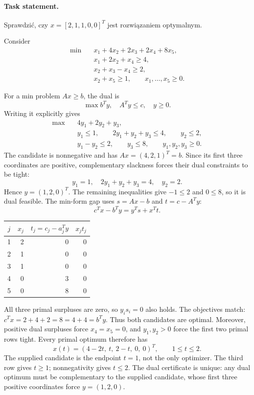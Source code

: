 \documentclass[11pt,a4paper]{article}
\begin{document}
\paragraph{Task statement.}
\foreignlanguage{polish}{Sprawdzić, czy $x=[2,1,1,0,0]^T$ jest rozwiązaniem
optymalnym.}
\begin{lecturecore}
  Consider
  \[
    \begin{aligned}
      \min\quad &x_1+4x_2+2x_3+2x_4+8x_5,\\
      &x_1+2x_2+x_4\geq4,\\
      &x_2+x_3-x_4\geq2,\\
      &x_2+x_5\geq1,\qquad x_1,\ldots,x_5\geq0.
    \end{aligned}
  \]
\end{lecturecore}
For a min problem $Ax\geq b$, the dual is
\[
  \max b^Ty,\quad A^Ty\leq c,\quad y\geq0.
\]
Writing it explicitly gives
\[
  \begin{aligned}
    \max\quad &4y_1+2y_2+y_3,\\
    &y_1\leq1,\qquad 2y_1+y_2+y_3\leq4,\qquad y_2\leq2,\\
    &y_1-y_2\leq2,\qquad y_3\leq8,\qquad y_1,y_2,y_3\geq0.
  \end{aligned}
\]
The candidate is nonnegative and has $Ax=(4,2,1)^T=b$. Since its first three
coordinates are positive, complementary slackness forces their dual constraints
to be tight:
\[
  y_1=1,\quad 2y_1+y_2+y_3=4,\quad y_2=2.
\]
Hence $y=(1,2,0)^T$. The remaining inequalities give $-1\leq2$ and $0\leq8$,
so it is dual feasible. The min-form gap uses $s=Ax-b$ and $t=c-A^Ty$:
\[
  c^Tx-b^Ty=y^Ts+x^Tt.
\]
\begin{center}
  \begin{tabular}{crrr}\toprule
    $j$ & $x_j$ & $t_j=c_j-a_j^Ty$ & $x_jt_j$\\\midrule
    1 & 2 & 0 & 0\\
    2 & 1 & 0 & 0\\
    3 & 1 & 0 & 0\\
    4 & 0 & 3 & 0\\
    5 & 0 & 8 & 0\\\bottomrule
  \end{tabular}
\end{center}
All three primal surpluses are zero, so $y_is_i=0$ also holds. The objectives
match: $c^Tx=2+4+2=8=4+4=b^Ty$. Thus both candidates are optimal.
Moreover, positive dual surpluses force $x_4=x_5=0$, and $y_1,y_2>0$ force the
first two primal rows tight. Every primal optimum therefore has
\begin{equation}\label{eq:optimal-segment}
  x(t)=(4-2t,\ t,\ 2-t,\ 0,\ 0)^T,\qquad 1\leq t\leq2.
\end{equation}
The supplied candidate is the endpoint $t=1$, not the only optimizer.
The third row gives $t\geq1$; nonnegativity gives $t\leq2$.
The dual certificate is unique: any dual optimum must be complementary to the
supplied candidate, whose first three positive coordinates force $y=(1,2,0)$.
\end{document}
